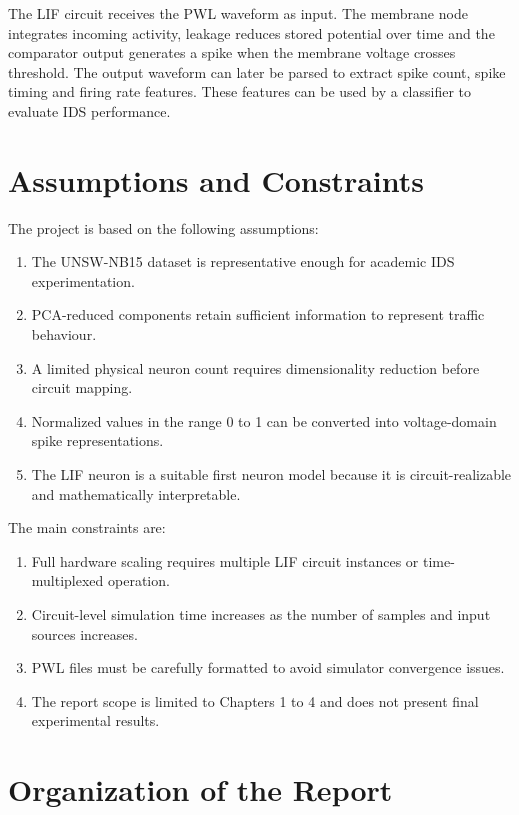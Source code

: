 The LIF circuit receives the PWL waveform as input. The membrane node integrates incoming activity, leakage reduces stored potential over time and the comparator output generates a spike when the membrane voltage crosses threshold. The output waveform can later be parsed to extract spike count, spike timing and firing rate features. These features can be used by a classifier to evaluate IDS performance.

\section[Assumptions and Constraints]{\textbf{Assumptions and Constraints}}

The project is based on the following assumptions:
\begin{enumerate}
\item The UNSW-NB15 dataset is representative enough for academic IDS experimentation.
\item PCA-reduced components retain sufficient information to represent traffic behaviour.
\item A limited physical neuron count requires dimensionality reduction before circuit mapping.
\item Normalized values in the range 0 to 1 can be converted into voltage-domain spike representations.
\item The LIF neuron is a suitable first neuron model because it is circuit-realizable and mathematically interpretable.
\end{enumerate}

The main constraints are:
\begin{enumerate}
\item Full hardware scaling requires multiple LIF circuit instances or time-multiplexed operation.
\item Circuit-level simulation time increases as the number of samples and input sources increases.
\item PWL files must be carefully formatted to avoid simulator convergence issues.
\item The report scope is limited to Chapters 1 to 4 and does not present final experimental results.
\end{enumerate}

\section[Organization of the Report]{\textbf{Organization of the Report}}

